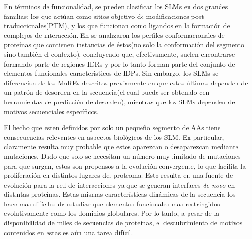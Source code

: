 En términos de funcionalidad, se pueden clasificar los SLMs en dos grandes familias: los que actúan como sitios objetivo de modificaciones post-traduccionales(PTM), 
y los que funcionan como ligandos en la formación de complejos de interacción.
En \cite{fuxreiter2007local} se analizaron los perfiles conformacionales de proteínas que contienen instancias de éstos(no solo la conformación del segmento sino también el contexto), concluyendo que, efectivamente, 
suelen encontrarse formando parte de regiones IDRs y por lo tanto forman parte del conjunto de elementos funcionales característicos de IDPs.
Sin embargo, los SLMs se diferencian de los MoREs descritos previamente en que estos últimos dependen de un patrón de desorden en la secuencia(el cual puede ser obtenido con herramientas de predicción de desorden), 
mientras que los SLMs dependen de motivos secuenciales específicos.

El hecho que esten definidos por solo un pequeño segmento de AAs tiene consecuencias relevantes en aspectos biológicos de los SLM.
En particular, claramente resulta muy probable que estos aparezcan o desaparezcan mediante mutaciones. 
Dado que solo se necesitan un número muy limitado de mutaciones para que surgan, estos son propensos a la evolución convergente, lo que facilita la proliferación en distintos lugares del proteoma.
Esto resulta en una fuente de evolución para la red de interacciones ya que se generan interfaces \textit{de novo} en distintas proteínas.
Estas mismas características dinámicas de la secuencia los hace mas difíciles de estudiar que elementos funcionales mas restringidos evolutivamente como los dominios globulares.
Por lo tanto, a pesar de la disponibilidad de miles de secuencias de proteínas, el descubrimiento de motivos contenidos en estas es aún una tarea difícil.







